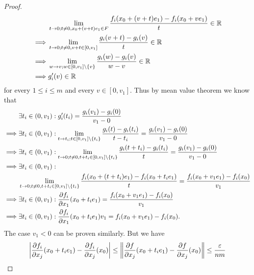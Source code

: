 \begin{proof}
\begin{align*}
             & \lim_{t \to 0 ; t \neq 0, x_0 + (v + t) e_1 \in F} \dfrac{f_i(x_0 + (v + t) e_1) - f_i(x_0 + v e_1)}{t} \in \R \\
    \implies & \lim_{t \to 0 ; t \neq 0, v + t \in [0, v_1]} \dfrac{g_i(v + t) - g_i(v)}{t} \in \R                            \\
    \implies & \lim_{w \to v ; w \in [0, v_1] \setminus \set{v}} \dfrac{g_i(w) - g_i(v)}{w - v} \in \R                        \\
    \implies & g_i'(v) \in \R
  \end{align*}
  for every \(1 \leq i \leq m\) and every \(v \in [0, v_1]\).
  Thus by mean value theorem we know that
  \begin{align*}
             & \exists t_i \in (0, v_1) : g_i'(t_i) = \dfrac{g_i(v_1) - g_i(0)}{v_1 - 0}                                                                                                \\
    \implies & \exists t_i \in (0, v_1) : \lim_{t \to t_i; t \in [0, v_1] \setminus \set{t_i}} \dfrac{g_i(t) - g_i(t_i)}{t - t_i} = \dfrac{g_i(v_1) - g_i(0)}{v_1 - 0}                  \\
    \implies & \exists t_i \in (0, v_1) : \lim_{t \to 0; t \neq 0, t + t_i \in [0, v_1] \setminus \set{t_i}} \dfrac{g_i(t + t_i) - g_i(t_i)}{t} = \dfrac{g_i(v_1) - g_i(0)}{v_1 - 0}    \\
    \implies & \exists t_i \in (0, v_1) :                                                                                                                                               \\
             & \lim_{t \to 0; t \neq 0, t + t_i \in [0, v_1] \setminus \set{t_i}} \dfrac{f_i(x_0 + (t + t_i) e_1) - f_i(x_0 + t_i e_1)}{t} = \dfrac{f_i(x_0 + v_1 e_1) - f_i(x_0)}{v_1} \\
    \implies & \exists t_i \in (0, v_1) : \dfrac{\partial f_i}{\partial x_1}(x_0 + t_i e_1) = \dfrac{f_i(x_0 + v_1 e_1) - f_i(x_0)}{v_1}                                                \\
    \implies & \exists t_i \in (0, v_1) : \dfrac{\partial f_i}{\partial x_1}(x_0 + t_i e_1) v_1 = f_i(x_0 + v_1 e_1) - f_i(x_0).
  \end{align*}
  The case \(v_1 < 0\) can be proven similarly.
  But we have
  \[
    \abs{\dfrac{\partial f_i}{\partial x_j}(x_0 + t_i e_1) - \dfrac{\partial f_i}{\partial x_j}(x_0)} \leq \norm*{\dfrac{\partial f}{\partial x_j}(x_0 + t_i e_1) - \dfrac{\partial f}{\partial x_j}(x_0)} \leq \dfrac{\varepsilon}{nm}
  \]

\end{proof}

